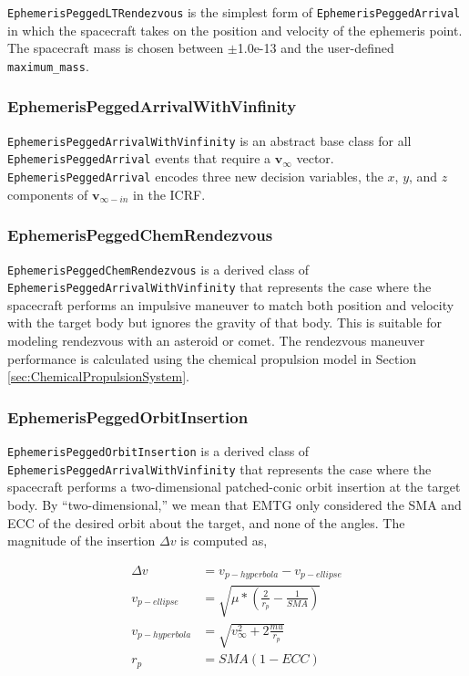\texttt{EphemerisPeggedLTRendezvous} is the simplest form of \texttt{EphemerisPeggedArrival} in which the spacecraft takes on the position and velocity of the ephemeris point. The spacecraft mass is chosen between $\pm$1.0e-13 and the user-defined \texttt{maximum\_mass}.

\subsubsection{EphemerisPeggedArrivalWithVinfinity}
\label{subsubsec:EphemerisPeggedArrivalWithVinfinity}

\texttt{EphemerisPeggedArrivalWithVinfinity} is an abstract base class for all \texttt{EphemerisPeggedArrival} events that require a $\mathbf{v}_\infty$ vector. \texttt{EphemerisPeggedArrival} encodes three new decision variables, the $x$, $y$, and $z$ components of $\mathbf{v}_{\infty-in}$ in the \ac{ICRF}.

\subsubsection{EphemerisPeggedChemRendezvous}
\label{subsubsec:EphemerisPeggedChemRendezvous}

\texttt{EphemerisPeggedChemRendezvous} is a derived class of \texttt{EphemerisPeggedArrivalWithVinfinity} that represents the case where the spacecraft performs an impulsive maneuver to match both position and velocity with the target body but ignores the gravity of that body. This is suitable for modeling rendezvous with an asteroid or comet. The rendezvous maneuver performance is calculated using the chemical propulsion model in Section \ref{sec:ChemicalPropulsionSystem}.

\subsubsection{EphemerisPeggedOrbitInsertion}
\label{subsubsec:EphemerisPeggedOrbitInsertion}

\texttt{EphemerisPeggedOrbitInsertion} is a derived class of \texttt{EphemerisPeggedArrivalWithVinfinity} that represents the case where the spacecraft performs a two-dimensional patched-conic orbit insertion at the target body. By ``two-dimensional,'' we mean that EMTG only considered the \ac{SMA} and \ac{ECC} of the desired orbit about the target, and none of the angles. The magnitude of the insertion $\Delta v$ is computed as,

\begin{align}
	\label{eq:EphemerisPeggedOrbitInsertion}
	\Delta v &= v_{p-hyperbola} - v_{p-ellipse}\\
	v_{p-ellipse} &= \sqrt{\mu * \left( \frac{2}{r_p} - \frac{1}{SMA}\right)}\\
	v_{p-hyperbola} &= \sqrt{v^2_\infty + 2\frac{mu}{r_p}}\\
	r_p &=SMA \left(1 - ECC\right)
\end{align}

